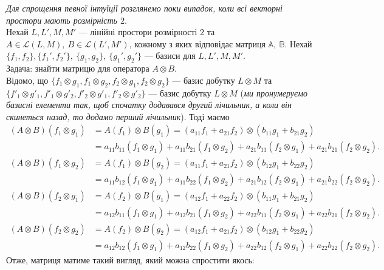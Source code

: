 \documentclass{math_library}
\begin{document}
\textit{Для спрощення певної інтуїції розглянемо поки випадок, коли всі векторні простори мають розмірність $2$}.
\bigskip \\
Нехай $L,L',M,M'$ --- лінійні простори розмірності $2$ та $A \in \mathcal{L}(L,M),\ B \in \mathcal{L}(L',M')$, кожному з яких відповідає матриця $\mathbb{A},\ \mathbb{B}$. Нехай $\{f_1,f_2\}, \{f_1',f_2'\},\ \{g_1,g_2\},\ \{g_1',g_2'\}$ --- базиси для $L,L',M,M'$.\\
Задача: знайти матрицю для оператора $A \otimes B$.
\bigskip \\
Відомо, що $\{f_1 \otimes g_1, f_1 \otimes g_2, f_2 \otimes g_1, f_2 \otimes g_2\}$ --- базис добутку $L \otimes M$ та $\{f'_1 \otimes g'_1, f'_1 \otimes g'_2, f'_2 \otimes g'_1, f'_2 \otimes g'_2\}$ --- базис добутку $L \otimes M$ (\textit{ми пронумеруємо базисні елементи так, щоб спочатку додавався другий лічильник, а коли він скинеться назад, то додамо перший лічильник}). Тоді маємо
\begin{align*}
(A \otimes B)(f_1 \otimes g_1) & = A(f_1) \otimes B(g_1) = (a_{11} f_1 + a_{21} f_2) \otimes (b_{11} g_1 + b_{21} g_2) \\
& = a_{11} b_{11} (f_1 \otimes g_1) + a_{11}b_{21} (f_1 \otimes g_2) + a_{21} b_{11} (f_2 \otimes g_1) + a_{21} b_{21} (f_2 \otimes g_2). \\
(A \otimes B)(f_1 \otimes g_2) & = A(f_1) \otimes B(g_2) = (a_{11} f_1 + a_{21} f_2) \otimes (b_{12} g_1 + b_{22} g_2) \\
& = a_{11} b_{12} (f_1 \otimes g_1) + a_{11}b_{22} (f_1 \otimes g_2) + a_{21} b_{12} (f_2 \otimes g_1) + a_{21} b_{22} (f_2 \otimes g_2).
\\
(A \otimes B)(f_2 \otimes g_1) & = A(f_2) \otimes B(g_1) = (a_{12} f_1 + a_{22} f_2) \otimes (b_{11} g_1 + b_{21} g_2) \\
& = a_{12} b_{11} (f_1 \otimes g_1) + a_{12}b_{21} (f_1 \otimes g_2) + a_{22} b_{11} (f_2 \otimes g_1) + a_{22} b_{21} (f_2 \otimes g_2). \\
(A \otimes B)(f_2 \otimes g_2) & = A(f_2) \otimes B(g_2) = (a_{12} f_1 + a_{21} f_2) \otimes (b_{12} g_1 + b_{22} g_2) \\
& = a_{12} b_{12} (f_1 \otimes g_1) + a_{12}b_{22} (f_1 \otimes g_2) + a_{22} b_{12} (f_2 \otimes g_1) + a_{22} b_{22} (f_2 \otimes g_2).
\end{align*}
Отже, матриця матиме такий вигляд, який можна спростити якось:
\end{document}
